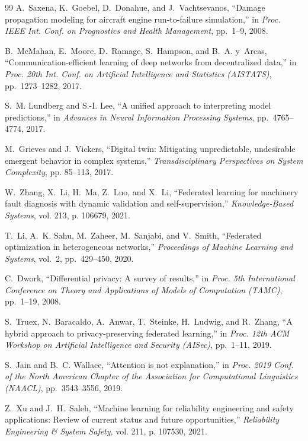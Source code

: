 \documentclass[journal,10pt,compsoc]{IEEEtran}
\begin{document}
\begin{thebibliography}{99}
A.~Saxena, K.~Goebel, D.~Donahue, and J.~Vachtsevanos, ``Damage propagation modeling for aircraft engine run-to-failure simulation,'' in \emph{Proc. IEEE Int. Conf. on Prognostics and Health Management}, pp.~1--9, 2008.

B.~McMahan, E.~Moore, D.~Ramage, S.~Hampson, and B.~A. y~Arcas, ``Communication-efficient learning of deep networks from decentralized data,'' in \emph{Proc. 20th Int. Conf. on Artificial Intelligence and Statistics (AISTATS)}, pp.~1273--1282, 2017.

S.~M. Lundberg and S.-I. Lee, ``A unified approach to interpreting model predictions,'' in \emph{Advances in Neural Information Processing Systems}, pp.~4765--4774, 2017.

M.~Grieves and J.~Vickers, ``Digital twin: Mitigating unpredictable, undesirable emergent behavior in complex systems,'' \emph{Transdisciplinary Perspectives on System Complexity}, pp. 85--113, 2017.

W.~Zhang, X.~Li, H.~Ma, Z.~Luo, and X.~Li, ``Federated learning for machinery fault diagnosis with dynamic validation and self-supervision,'' \emph{Knowledge-Based Systems}, vol. 213, p. 106679, 2021.

T.~Li, A.~K. Sahu, M.~Zaheer, M.~Sanjabi, and V.~Smith, ``Federated optimization in heterogeneous networks,'' \emph{Proceedings of Machine Learning and Systems}, vol.~2, pp.~429--450, 2020.

C.~Dwork, ``Differential privacy: A survey of results,'' in \emph{Proc. 5th International Conference on Theory and Applications of Models of Computation (TAMC)}, pp.~1--19, 2008.

S.~Truex, N.~Baracaldo, A.~Anwar, T.~Steinke, H.~Ludwig, and R.~Zhang, ``A hybrid approach to privacy-preserving federated learning,'' in \emph{Proc. 12th ACM Workshop on Artificial Intelligence and Security (AISec)}, pp.~1--11, 2019.

S.~Jain and B.~C. Wallace, ``Attention is not explanation,'' in \emph{Proc. 2019 Conf. of the North American Chapter of the Association for Computational Linguistics (NAACL)}, pp.~3543--3556, 2019.

Z.~Xu and J.~H.~Saleh, ``Machine learning for reliability engineering and safety applications: Review of current status and future opportunities,'' \emph{Reliability Engineering \& System Safety}, vol. 211, p. 107530, 2021.


\end{thebibliography}
\end{document}
